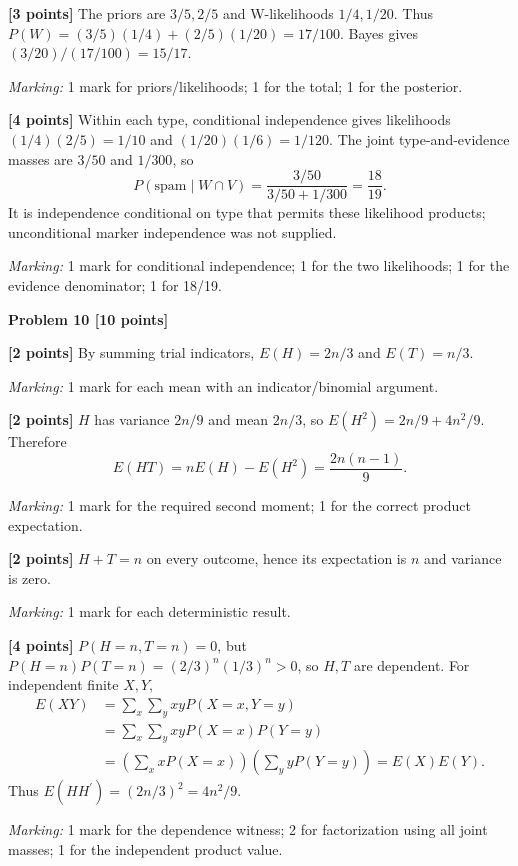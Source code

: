 \documentclass[12pt,letterpaper]{article}
\newcommand{\problemheading}[2][5\baselineskip]{\Needspace{#1}\par\noindent\hspace*{-0.625in}\textbf{#2}\par\nobreak\vspace{0.3em}}
\begin{document}
\begin{description}[font=\normalfont,leftmargin=1.2em,labelsep=0.4em]
\item[(a)] \textbf{[3 points]} The priors are $3/5,2/5$ and W-likelihoods $1/4,1/20$. Thus $P(W)=(3/5)(1/4)+(2/5)(1/20)=17/100$. Bayes gives $(3/20)/(17/100)=15/17$.
\par\textit{Marking:} 1 mark for priors/likelihoods; 1 for the total; 1 for the posterior.
\item[(b)] \textbf{[4 points]} Within each type, conditional independence gives likelihoods $(1/4)(2/5)=1/10$ and $(1/20)(1/6)=1/120$. The joint type-and-evidence masses are $3/50$ and $1/300$, so\[P(\text{spam}\mid W\cap V)=\frac{3/50}{3/50+1/300}=\frac{18}{19}.\]It is independence conditional on type that permits these likelihood products; unconditional marker independence was not supplied.
\par\textit{Marking:} 1 mark for conditional independence; 1 for the two likelihoods; 1 for the evidence denominator; 1 for 18/19.
\end{description}
\vspace{0.65em}
\problemheading[\dimexpr 3\baselineskip+4\baselineskip\relax]{Problem 10 [10 points]}
\begin{description}[font=\normalfont,leftmargin=1.2em,labelsep=0.4em]
\item[(a)] \textbf{[2 points]} By summing trial indicators, $E(H)=2n/3$ and $E(T)=n/3$.
\par\textit{Marking:} 1 mark for each mean with an indicator/binomial argument.
\item[(b)] \textbf{[2 points]} $H$ has variance $2n/9$ and mean $2n/3$, so $E(H^2)=2n/9+4n^2/9$. Therefore\[E(HT)=nE(H)-E(H^2)=\frac{2n(n-1)}9.\]
\par\textit{Marking:} 1 mark for the required second moment; 1 for the correct product expectation.
\item[(c)] \textbf{[2 points]} $H+T=n$ on every outcome, hence its expectation is $n$ and variance is zero.
\par\textit{Marking:} 1 mark for each deterministic result.
\item[(d)] \textbf{[4 points]} $P(H=n,T=n)=0$, but $P(H=n)P(T=n)=(2/3)^n(1/3)^n>0$, so $H,T$ are dependent. For independent finite $X,Y$,\[\begin{aligned}E(XY)&=\sum_x\sum_yxyP(X=x,Y=y)\\&=\sum_x\sum_yxyP(X=x)P(Y=y)\\&=\left(\sum_xxP(X=x)\right)\left(\sum_yyP(Y=y)\right)=E(X)E(Y).\end{aligned}\]Thus $E(HH^{\prime})=(2n/3)^2=4n^2/9$.
\par\textit{Marking:} 1 mark for the dependence witness; 2 for factorization using all joint masses; 1 for the independent product value.
\end{description}
\end{document}
